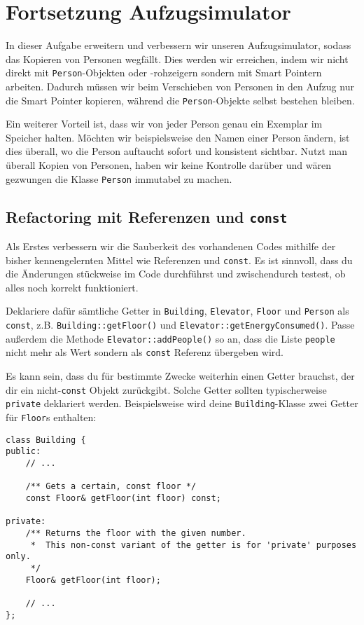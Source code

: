 \section{Fortsetzung Aufzugsimulator}
In dieser Aufgabe erweitern und verbessern wir unseren Aufzugsimulator, sodass das Kopieren von Personen wegfällt.
Dies werden wir erreichen, indem wir nicht direkt mit \texttt{Person}-Objekten oder -rohzeigern sondern mit Smart Pointern arbeiten.
Dadurch müssen wir beim Verschieben von Personen in den Aufzug nur die Smart Pointer kopieren, während die \texttt{Person}-Objekte selbst bestehen bleiben.

Ein weiterer Vorteil ist, dass wir von jeder Person genau ein Exemplar im Speicher halten.
Möchten wir beispielsweise den Namen einer Person ändern, ist dies überall, wo die Person auftaucht sofort und konsistent sichtbar.
Nutzt man überall Kopien von Personen, haben wir keine Kontrolle darüber und wären gezwungen die Klasse \texttt{Person} immutabel zu machen.


\subsection{Refactoring mit Referenzen und \texttt{const}}
Als Erstes verbessern wir die Sauberkeit des vorhandenen Codes mithilfe der bisher kennengelernten Mittel wie Referenzen und \texttt{const}.
Es ist sinnvoll, dass du die Änderungen stückweise im Code durchführst und zwischendurch testest, ob alles noch korrekt funktioniert.

Deklariere dafür sämtliche Getter in \texttt{Building}, \texttt{Elevator}, \texttt{Floor} und \texttt{Person} als \texttt{const}, z.B. \texttt{Building::getFloor()} und \texttt{Elevator::getEnergyConsumed()}.
Passe außerdem die Methode \texttt{Elevator::addPeople()} so an, dass die Liste \texttt{people} nicht mehr als Wert sondern als \texttt{const} Referenz übergeben wird.

Es kann sein, dass du für bestimmte Zwecke weiterhin einen Getter brauchst, der dir ein nicht-\texttt{const} Objekt zurückgibt.
Solche Getter sollten typischerweise \texttt{private} deklariert werden.
Beispielsweise wird deine \texttt{Building}-Klasse zwei Getter für \texttt{Floor}s enthalten:
\begin{lstlisting}
class Building {
public:
    // ...

    /** Gets a certain, const floor */
    const Floor& getFloor(int floor) const;

private:
    /** Returns the floor with the given number. 
     *  This non-const variant of the getter is for 'private' purposes only. 
     */
    Floor& getFloor(int floor);

    // ...
};
\end{lstlisting}

